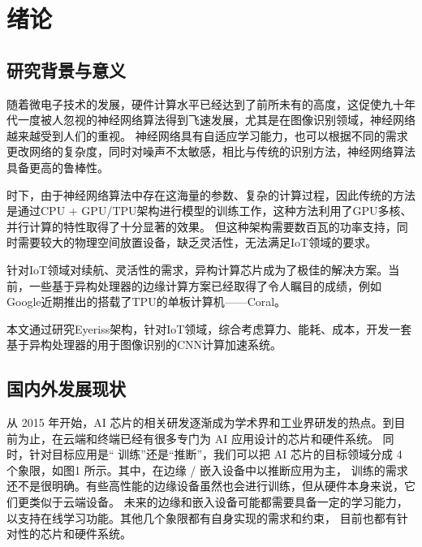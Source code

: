 \chapter{绪论}

\section{研究背景与意义}
    随着微电子技术的发展，硬件计算水平已经达到了前所未有的高度，这促使九十年代一度被人忽视的神经网络算法得到飞速发展，尤其是在图像识别领域，神经网络越来越受到人们的重视。
    神经网络具有自适应学习能力，也可以根据不同的需求更改网络的复杂度，同时对噪声不太敏感，相比与传统的识别方法，神经网络算法具备更高的鲁棒性。

    时下，由于神经网络算法中存在这海量的参数、复杂的计算过程，因此传统的方法是通过CPU + GPU/TPU架构进行模型的训练工作，这种方法利用了GPU多核、并行计算的特性取得了十分显著的效果。
    但这种架构需要数百瓦的功率支持，同时需要较大的物理空间放置设备，缺乏灵活性，无法满足IoT领域的要求。

    针对IoT领域对续航、灵活性的需求，异构计算芯片成为了极佳的解决方案。当前，一些基于异构处理器的边缘计算方案已经取得了令人瞩目的成绩，例如Google近期推出的搭载了TPU的单板计算机——Coral。

    本文通过研究Eyeriss架构，针对IoT领域，综合考虑算力、能耗、成本，开发一套基于异构处理器的用于图像识别的CNN计算加速系统。

\section{国内外发展现状}
    从 2015 年开始，AI 芯片的相关研发逐渐成为学术界和工业界研发的热点。到目前为止，在云端和终端已经有很多专门为 AI 应用设计的芯片和硬件系统。
    同时，针对目标应用是“ 训练”还是“推断”，我们可以把 AI 芯片的目标领域分成 4 个象限，如图1 所示。其中，在边缘 / 嵌入设备中以推断应用为主，
    训练的需求还不是很明确。有些高性能的边缘设备虽然也会进行训练，但从硬件本身来说，它们更类似于云端设备。
    未来的边缘和嵌入设备可能都需要具备一定的学习能力，以支持在线学习功能。其他几个象限都有自身实现的需求和约束，
    目前也都有针对性的芯片和硬件系统。

